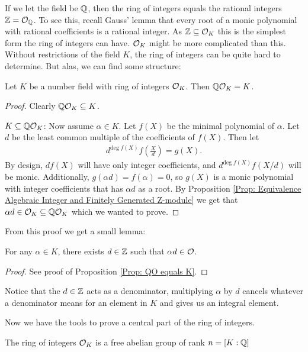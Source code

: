     If we let the field be \(\mathbb{Q}\), then the ring of integers equals the rational integers \(\mathbb{Z} = \mathcal{O}_{\mathbb{Q}}\). To see this, recall Gauss'  lemma that every root of a monic polynomial with rational coefficients is a rational integer. As \(\mathbb{Z}\subseteq\mathcal{O}_K\) this is the simplest form the ring of integers can have. \(\mathcal{O}_K\) might be more complicated than this. Without restrictions of the field \(K\), the ring of integers can be quite hard to determine. But alas, we can find some structure:
    \begin{proposition}
    \label{Prop: QO equals K}
        Let \(K\) be a number field with ring of integers \(\mathcal{O}_K\). Then \(\mathbb{Q}\mathcal{O}_K = K\).
    \end{proposition}
    \begin{proof}
        Clearly \(\mathbb{Q}\mathcal{O}_K\subseteq K\).\par
        \underline{\(K\subseteq\mathbb{Q}\mathcal{O}_K\)}: Now assume \(\alpha\in K\). Let \(f(X)\) be the minimal polynomial of \(\alpha\). Let \(d\) be the least common multiple of the coefficients of \(f(X)\). Then let 
        \begin{align*}
            d^{\text{deg}\;f(X)}f(\frac{X}{d}) = g(X).
        \end{align*}
        By design, \(df(X)\) will have only integer coefficients, and \(d^{\text{deg}\;f(X)}f(X/d)\) will be monic. Additionally, \(g(\alpha d) = f(\alpha) = 0\), so \(g(X)\) is a monic polynomial with integer coefficients that has \(\alpha d\) as a root. By Proposition \ref{Prop: Equivalence Algebraic Integer and Finitely Generated Z-module} we get that \(\alpha d\in\mathcal{O}_K\subseteq\mathbb{Q}\mathcal{O}_K\) which we wanted to prove. 
    \end{proof}
    From this proof we get a small lemma:
    \begin{lemma}
        \label{Lemma: a in K can be ad in O}
        For any \(\alpha\in K\), there exists \(d\in\mathbb{Z}\) such that \(\alpha d \in\mathcal{O}\).
    \end{lemma}
    \begin{proof}
        See proof of Proposition \ref{Prop: QO equals K}.
    \end{proof}
    Notice that the \(d\in\mathbb{Z}\) acts as a denominator, multiplying \(\alpha\) by \(d\) cancels whatever a denominator means for an element in \(K\) and gives us an integral element. \par
    Now we have the tools to prove a central part of the ring of integers.
    \begin{theorem}
    \label{Thm: O is free}
        The ring of integers \(\mathcal{O}_K\) is a free abelian group of rank \(n = [K:\mathbb{Q}]\)
    \end{theorem}
